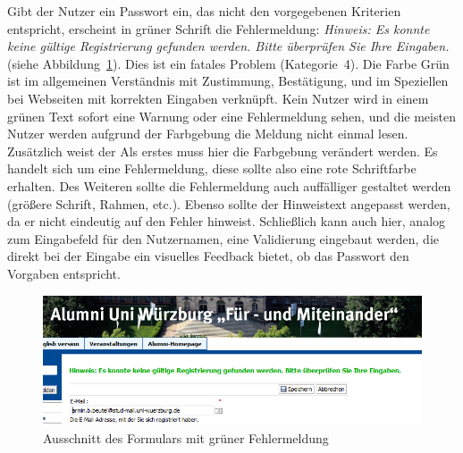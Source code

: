 {
Gibt der Nutzer ein Passwort ein, das nicht den vorgegebenen Kriterien entspricht, erscheint in grüner Schrift die Fehlermeldung: \emph{Hinweis: Es konnte keine gültige Registrierung gefunden werden. Bitte überprüfen Sie Ihre Eingaben.} (siehe Abbildung~\ref{fig:greenerror}).
}
{
Dies ist ein fatales Problem (Kategorie~4). Die Farbe Grün ist im allgemeinen Verständnis mit Zustimmung, Bestätigung, und im Speziellen bei Webseiten mit korrekten Eingaben verknüpft. Kein Nutzer wird in einem grünen Text sofort eine Warnung oder eine Fehlermeldung sehen, und die meisten Nutzer werden aufgrund der Farbgebung die Meldung nicht einmal lesen. Zusätzlich weist der 
}
{
Als erstes muss hier die Farbgebung verändert werden. Es handelt sich um eine Fehlermeldung, diese sollte also eine rote Schriftfarbe erhalten. Des Weiteren sollte die Fehlermeldung auch auffälliger gestaltet werden (größere Schrift, Rahmen, etc.). Ebenso sollte der Hinweistext angepasst werden, da er nicht eindeutig auf den Fehler hinweist. Schließlich kann auch hier, analog zum Eingabefeld für den Nutzernamen, eine Validierung eingebaut werden, die direkt bei der Eingabe ein visuelles Feedback bietet, ob das Passwort den Vorgaben entspricht.
}
\label{prob:frei:warntextgruen}

\begin{figure}
	\centering
		\includegraphics[width=\textwidth]{figures/greenerror.png}
	\caption{Ausschnitt des Formulars mit grüner Fehlermeldung}
	\label{fig:greenerror}
\end{figure}

